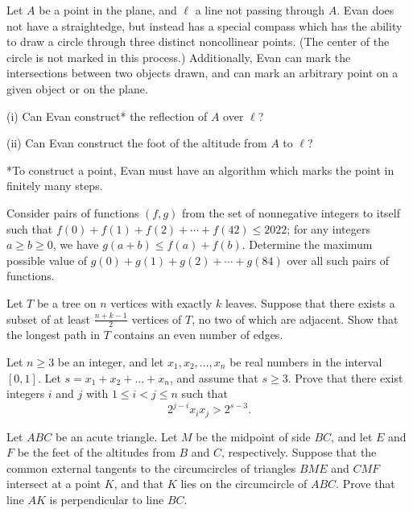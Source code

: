 \documentclass[11pt]{scrartcl}
\begin{document}
\begin{problem}[70043882336455]
Let $A$ be a point in the plane, and $\ell$ a line not passing through $A$. Evan does not have a straightedge, but instead has a special compass which has the ability to draw a circle through three distinct noncollinear points. (The center of the circle is not marked in this process.) Additionally, Evan can mark the intersections between two objects drawn, and can mark an arbitrary point on a given object or on the plane.

(i) Can Evan construct* the reflection of $A$ over $\ell$?

(ii) Can Evan construct the foot of the altitude from $A$ to $\ell$?

*To construct a point, Evan must have an algorithm which marks the point in finitely many steps.
\end{problem}
\begin{problem}[20663652231924]
Consider pairs of functions $(f, g)$ from the set of nonnegative integers to itself such that
$f(0) + f(1) + f(2) + \cdots + f(42) \le 2022$;
for any integers $a \ge b \ge 0$, we have $g(a+b) \le f(a) + f(b)$.
Determine the maximum possible value of $g(0) + g(1) + g(2) + \cdots + g(84)$ over all such pairs of functions.
\end{problem}
\begin{problem}[521969466382456]
	Let $T$ be a tree on $n$ vertices with exactly $k$ leaves. Suppose that there exists a subset of at least $\frac{n+k-1}{2}$ vertices of $T$, no two of which are adjacent. Show that the longest path in $T$ contains an even number of edges. 
\end{problem}
\begin{problem}[7550072974614174968]
Let $n \geqslant 3$ be an integer, and let $x_1,x_2,\ldots,x_n$ be real numbers in the interval $[0,1]$. Let $s=x_1+x_2+\ldots+x_n$, and assume that $s \geqslant 3$. Prove that there exist integers $i$ and $j$ with $1 \leqslant i<j \leqslant n$ such that
\[2^{j-i}x_ix_j>2^{s-3}.\]
\end{problem}
\begin{problem}[4018921933875333744]
	Let $ABC$ be an acute triangle. Let $M$ be the midpoint of side $BC$, and let $E$ and $F$ be the feet of the altitudes from $B$ and $C$, respectively. Suppose that the common external tangents to the circumcircles of triangles $BME$ and $CMF$ intersect at a point $K$, and that $K$ lies on the circumcircle of $ABC$. Prove that line $AK$ is perpendicular to line $BC$.
\end{problem}
\end{document}
